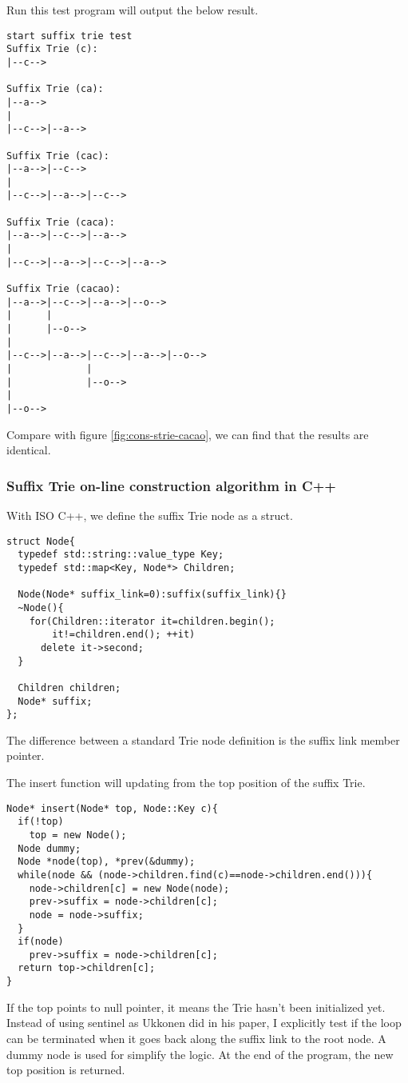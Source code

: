 \documentclass{article}
\begin{document}
Run this test program will output the below result.

\begin{verbatim}
start suffix trie test
Suffix Trie (c):
|--c--> 

Suffix Trie (ca):
|--a-->
|
|--c-->|--a--> 

Suffix Trie (cac):
|--a-->|--c-->
|
|--c-->|--a-->|--c--> 

Suffix Trie (caca):
|--a-->|--c-->|--a-->
|
|--c-->|--a-->|--c-->|--a--> 

Suffix Trie (cacao):
|--a-->|--c-->|--a-->|--o-->
|      |
|      |--o-->
|
|--c-->|--a-->|--c-->|--a-->|--o-->
|             |
|             |--o-->
|
|--o--> 
\end{verbatim}

Compare with figure \ref{fig:cons-strie-cacao}, we can find that the results are identical.

\subsubsection*{Suffix Trie on-line construction algorithm in C++}
With ISO C++, we define the suffix Trie node as a struct.

\lstset{language=C++}
\begin{lstlisting}
struct Node{
  typedef std::string::value_type Key;
  typedef std::map<Key, Node*> Children;

  Node(Node* suffix_link=0):suffix(suffix_link){}
  ~Node(){
    for(Children::iterator it=children.begin();
        it!=children.end(); ++it)
      delete it->second;
  }

  Children children;
  Node* suffix;
};
\end{lstlisting}

The difference between a standard Trie node definition is 
the suffix link member pointer.

The insert function will updating from the top position of
the suffix Trie.

\begin{lstlisting}
Node* insert(Node* top, Node::Key c){
  if(!top)
    top = new Node();
  Node dummy;
  Node *node(top), *prev(&dummy);
  while(node && (node->children.find(c)==node->children.end())){
    node->children[c] = new Node(node);
    prev->suffix = node->children[c];
    node = node->suffix;
  }
  if(node)
    prev->suffix = node->children[c];
  return top->children[c];
}
\end{lstlisting}

If the top points to null pointer, it means the Trie hasn't been
initialized yet. Instead of using sentinel as Ukkonen did in his
paper, I explicitly test if the loop can be terminated when it
goes back along the suffix link to the root node. A dummy node
is used for simplify the logic. At the end of the program, the
new top position is returned.
\end{document}
